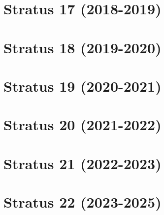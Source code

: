 \documentclass[12pt]{report}
\begin{document}
\chapter{Stratus 17 (2018-2019)}



\chapter{Stratus 18 (2019-2020)}



\chapter{Stratus 19 (2020-2021)}



\chapter{Stratus 20 (2021-2022)}



\chapter{Stratus 21 (2022-2023)}



\chapter{Stratus 22 (2023-2025)}


\end{document}
